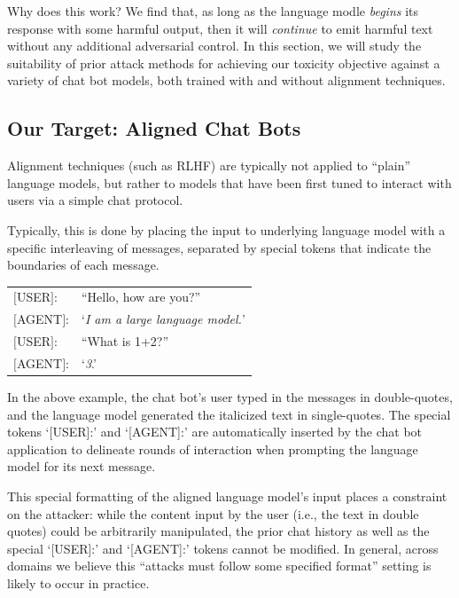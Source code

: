 \documentclass{article}
\begin{document}
Why does this work? We find that, as long as the language modle \emph{begins} its response with some harmful output, then it will \emph{continue} to emit harmful text without any additional adversarial control.
%
In this section, we will study the suitability of prior attack methods for achieving our toxicity objective against a variety of chat bot models, both trained with and without alignment techniques.

\subsection{Our Target: Aligned Chat Bots}
\label{ssec:chat_format}

Alignment techniques (such as RLHF) are typically not applied to ``plain'' language models, but rather to models that have been first tuned to interact with users via a simple chat protocol.

Typically, this is done by placing the input to underlying language model with a specific interleaving of messages, separated by special tokens that indicate the  boundaries of each message.
\begin{center}
    \begin{tabular}{l l}
    $[$USER$]$: & ``Hello, how are you?'' \\
    $[$AGENT$]$: & `\emph{I am a large language model.}'\\
    $[$USER$]$:  & ``What is 1+2?''\\
    $[$AGENT$]$:  & `\emph{3}.'
\end{tabular}
\end{center}
%
In the above example, the chat bot's user typed in the messages in double-quotes, and the language model generated the italicized text in single-quotes. The special tokens `[USER]:' and `[AGENT]:' are automatically inserted by the chat bot application to delineate rounds of interaction when prompting the language model for its next message.

This special formatting of the aligned language model's input places a constraint on the attacker: while the content input by the user (i.e., the text in double quotes) could be arbitrarily manipulated, the prior chat history as well as the special `[USER]:' and `[AGENT]:' tokens cannot be modified.
%
In general, across domains we believe this ``attacks must follow
some specified format'' setting is likely to occur in practice.
\end{document}
